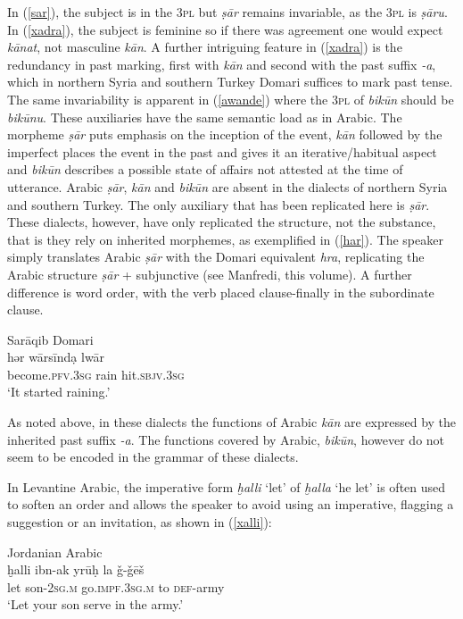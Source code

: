 \documentclass[output=paper]{langsci/langscibook}
\begin{document}
In (\ref{sar}), the subject is in the 3\textsc{pl} but \textit{ṣār} remains invariable, as the \textsc{3pl} is \textit{ṣāru}. In (\ref{xadra}), the subject is feminine so if there was agreement one would expect \textit{kānat}, not masculine \textit{kān}. A further intriguing feature in (\ref{xadra}) is the redundancy in past marking, first with \textit{kān} and second with the past suffix \textit{{}-a}, which in northern Syria and southern Turkey Domari suffices to mark past tense. The same invariability is apparent in (\ref{awande}) where the \textsc{3pl} of \textit{bikūn} should be \textit{bikūnu}. These auxiliaries have the same semantic load as in Arabic. The morpheme \textit{ṣār} puts emphasis on the inception of the event, \textit{kān} followed by the imperfect places the event in the past and gives it an iterative/habitual aspect and \textit{bikūn} describes a possible state of affairs not attested at the time of utterance. Arabic \textit{ṣār}, \textit{kān} and \textit{bikūn} are absent in the dialects of northern Syria and southern Turkey. The only auxiliary that has been replicated here is \textit{ṣār}. These dialects, however, have only replicated the structure, not the substance, that is they rely on inherited morphemes, as exemplified in (\ref{har}). The speaker simply translates Arabic \textit{ṣār} with the Domari equivalent \textit{hra}, replicating the Arabic structure \textit{ṣār} + subjunctive (see Manfredi, this volume). A further difference is word order, with the verb placed clause-finally in the subordinate clause. 

\ea \label{har}
{Sarāqib Domari}\\
\gll hər wārsīndạ lwār\\
     become.\textsc{pfv.3sg} rain hit.\textsc{sbjv.3sg}\\
\glt ‘It started raining.’
\z

As noted above, in these dialects the functions of Arabic \textit{kān} are expressed by the inherited past suffix \textit{-a}. The functions covered by Arabic, \textit{bikūn}, however do not seem to be encoded in the grammar of these dialects.

In Levantine Arabic, the imperative form \textit{ḫalli} ‘let’ of \textit{ḫalla} ‘he let’ is often used to soften an order and allows the speaker to avoid using an imperative, flagging a suggestion or an invitation, as shown in (\ref{xalli}):

\ea \label{xalli}
{Jordanian Arabic}\\
\gll ḫalli ibn-ak yrūḥ la \v{g}-\v{g}ēš\\
     let son-\textsc{2sg.m} go.\textsc{impf.3sg.m} to \textsc{def}{}-army\\
\glt ‘Let your son serve in the army.’
\z
\end{document}
